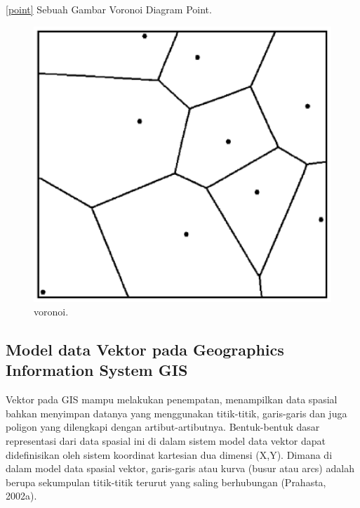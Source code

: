 \ref{point} Sebuah Gambar Voronoi Diagram Point.
\begin{figure}[ht]
	\centerline{\includegraphics[width=1\textwidth]{figures/voronoi.PNG}}
	\caption{voronoi.}
	\label{voronoi}
	\end{figure}

\subsection{Model data Vektor pada Geographics Information System GIS}
Vektor  pada GIS mampu melakukan penempatan, menampilkan data spasial bahkan menyimpan datanya yang menggunakan titik-titik, garis-garis dan juga poligon yang dilengkapi dengan artibut-artibutnya. Bentuk-bentuk dasar representasi dari data spasial ini di dalam sistem model data vektor dapat didefinisikan oleh sistem koordinat kartesian dua dimensi (X,Y). Dimana di dalam model data spasial vektor, garis-garis atau kurva (busur atau arcs) adalah berupa sekumpulan titik-titik terurut yang saling berhubungan (Prahasta, 2002a). 

